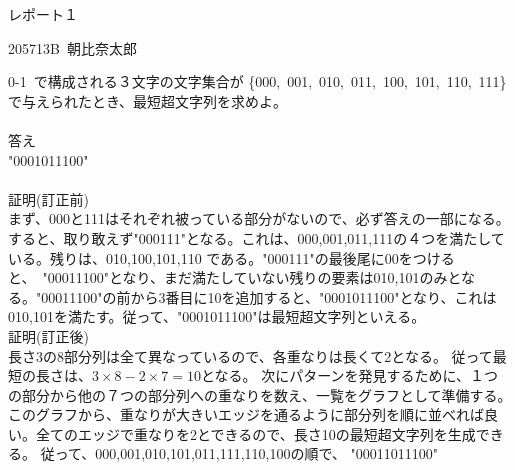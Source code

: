 \documentclass[11pt]{jsarticle}
\begin{document}
レポート１\\
\begin{flushright}
  205713B\ 朝比奈太郎
\end{flushright}

0-1\ で構成される３文字の文字集合が
\{000,\ 001,\ 010,\ 011,\ 100,\ 101,\ 110,\ 111\}で与えられたとき、最短超文字列を求めよ。\\
\\答え
\\"0001011100"\\
\\ 証明(訂正前)\\
まず、000と111はそれぞれ被っている部分がないので、必ず答えの一部になる。すると、取り敢えず"000111"となる。これは、000,001,011,111の４つを満たしている。残りは、010,100,101,110 である。"000111"の最後尾に00をつけると、　"00011100"となり、まだ満たしていない残りの要素は010,101のみとなる。"00011100"の前から3番目に10を追加すると、"0001011100"となり、これは010,101を満たす。従って、"0001011100"は最短超文字列といえる。\\

証明(訂正後)\\
長さ3の8部分列は全て異なっているので、各重なりは長くて2となる。
従って最短の長さは、$3\times 8-2\times7=10$となる。
次にパターンを発見するために、１つの部分から他の７つの部分列への重なりを数え、一覧をグラフとして準備する。このグラフから、重なりが大きいエッジを通るように部分列を順に並べれば良い。全てのエッジで重なりを2とできるので、長さ10の最短超文字列を生成できる。
従って、000,001,010,101,011,111,110,100の順で、 "00011011100"
\end{document}
